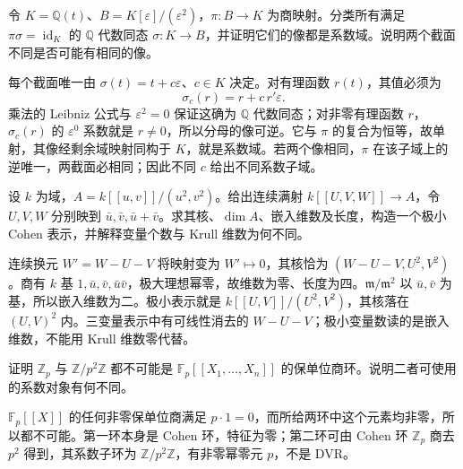 \begin{exercise}\label{b3:ex:D-coefficient-field-nonunique}
	令 \(K=\mathbb Q(t)\)、\(B=K[\varepsilon]/(\varepsilon^2)\)，\(\pi:B\to K\) 为商映射。分类所有满足 \(\pi\sigma=\operatorname{id}_K\) 的 \(\mathbb Q\) 代数同态 \(\sigma:K\to B\)，并证明它们的像都是系数域。说明两个截面不同是否可能有相同的像。
\end{exercise}
\begin{solution}
	每个截面唯一由 \(\sigma(t)=t+c\varepsilon\)、\(c\in K\) 决定。对有理函数 \(r(t)\)，其值必须为
	\[
		\sigma_c(r)=r+c\,r'\varepsilon.
	\]
	乘法的 Leibniz 公式与 \(\varepsilon^2=0\) 保证这确为 \(\mathbb Q\) 代数同态；对非零有理函数 \(r\)，\(\sigma_c(r)\) 的 \(\varepsilon^0\) 系数就是 \(r\ne0\)，所以分母的像可逆。它与 \(\pi\) 的复合为恒等，故单射，其像经剩余域映射同构于 \(K\)，就是系数域。若两个像相同，\(\pi\) 在该子域上的逆唯一，两截面必相同；因此不同 \(c\) 给出不同系数子域。
\end{solution}

\begin{exercise}\label{b3:ex:D-minimal-cohen-kernel}
	设 \(k\) 为域，\(A=k[\![u,v]\!]/(u^2,v^2)\)。给出连续满射 \(k[\![U,V,W]\!]\to A\)，令 \(U,V,W\) 分别映到 \(\bar u,\bar v,\bar u+\bar v\)。求其核、\(\dim A\)、嵌入维数及长度，构造一个极小 Cohen 表示，并解释变量个数与 Krull 维数为何不同。
\end{exercise}
\begin{solution}
	连续换元 \(W'=W-U-V\) 将映射变为 \(W'\mapsto0\)，其核恰为 \((W-U-V,U^2,V^2)\)。商有 \(k\) 基 \(1,\bar u,\bar v,\bar u\bar v\)，极大理想幂零，故维数为零、长度为四。\(\mathfrak m/\mathfrak m^2\) 以 \(\bar u,\bar v\) 为基，所以嵌入维数为二。极小表示就是 \(k[\![U,V]\!]/(U^2,V^2)\)，其核落在 \((U,V)^2\) 内。三变量表示中有可线性消去的 \(W-U-V\)；极小变量数读的是嵌入维数，不能用 Krull 维数零代替。
\end{solution}

\begin{exercise}\label{b3:ex:D-characteristic-obstruction}
	证明 \(\mathbb Z_p\) 与 \(\mathbb Z/p^2\mathbb Z\) 都不可能是 \(\mathbb F_p[\![X_1,\ldots,X_n]\!]\) 的保单位商环。说明二者可使用的系数对象有何不同。
\end{exercise}
\begin{solution}
	\(\mathbb F_p[\![X]\!]\) 的任何非零保单位商满足 \(p\cdot1=0\)，而所给两环中这个元素均非零，所以都不可能。第一环本身是 Cohen 环，特征为零；第二环可由 Cohen 环 \(\mathbb Z_p\) 商去 \(p^2\) 得到，其系数子环为 \(\mathbb Z/p^2\mathbb Z\)，有非零幂零元 \(p\)，不是 DVR。
\end{solution}

